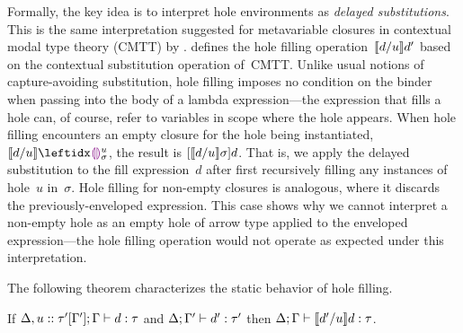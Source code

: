 Formally,
%
the key idea is to interpret hole environments as \emph{delayed substitutions}. This is the same interpretation suggested for metavariable closures in contextual modal
type theory (CMTT) by \citet{Nanevski2008}.
%
%
 defines the hole filling operation~$\llbracket d / u\rrbracket d'$
based on the contextual substitution operation of~CMTT.
%
Unlike usual notions of capture-avoiding substitution,
hole filling imposes no condition on the binder when passing into the
body of a lambda expression---the expression that fills a hole can, of
course, refer to variables in scope where the hole appears.
%
When hole filling encounters an empty closure for the hole being
instantiated, $\instantiate{d}{u}{\dehole{u}{\sigma}{}}$, the result
is $[\llbracket d / u\rrbracket \sigma]d$.
%
That is, we apply the delayed substitution to the fill expression~$d$
after first recursively filling any instances of hole~$u$ in~$\sigma$.
%
Hole filling for non-empty closures is analogous, where it discards
the previously-enveloped expression.
%
%
%
This case shows why we cannot interpret a non-empty hole as an empty
hole of arrow type applied to the enveloped expression---the hole
filling operation would not operate as expected under this
interpretation.




The following theorem characterizes the static behavior of hole filling.
\begin{thm}[Filling]
  If $\Delta, u :: \tau'[\Gamma']; \Gamma \vdash d : \tau$
  and $\Delta; \Gamma' \vdash d' : \tau'$
  then $\Delta; \Gamma \vdash \llbracket d' / u\rrbracket d : \tau$.
\end{thm}

